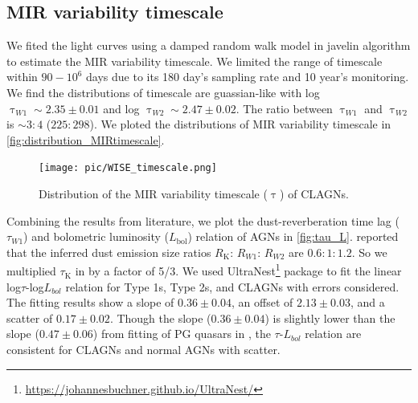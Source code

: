 \subsection{MIR variability timescale}
We fited the light curves using a damped random walk model in {\sc javelin} algorithm \citep[][]{2011ApJ...735...80Z,2013ApJ...765..106Z} to estimate the MIR variability timescale. We limited the range of timescale within $90-10^{6}$ days due to its 180 day's sampling rate and 10 year's monitoring. We find the distributions of timescale are guassian-like with log${\uptau _{W1}}\sim 2.35\pm 0.01$ and log ${\uptau_{W2}}\sim 2.47\pm 0.02$. The ratio between ${\uptau _{W1}}$ and ${\uptau _{W2}}$ is $\sim 3:4$ ($225:298$). We ploted the distributions of MIR variability timescale in \autoref{fig:distribution_MIRtimescale}.

\begin{figure}
\centering
	\texttt{[image: pic/WISE\_timescale.png]}
    \caption{Distribution of the MIR variability timescale ($\uptau$) of CLAGNs.}
    \label{fig:distribution_MIRtimescale}
\end{figure}




Combining the results from literature, we plot the dust-reverberation time lag ($\tau_{W1}$) and bolometric luminosity ($L_\mathrm{bol}$) relation of AGNs in \autoref{fig:tau_L}. \citet[][]{2019ApJ...886...33L} reported that the inferred dust emission size ratios $R_\mathrm{K}$: $R_{W1}$: $R_{W2}$ are $0.6: 1: 1.2$. So we multiplied $\tau_\mathrm{K}$ in \citet[][]{2014ApJ...788..159K,2019ApJ...886...33L} by a factor of 5/3. We used UltraNest\footnote{\url{https://johannesbuchner.github.io/UltraNest/}} package \citep{2021JOSS....6.3001B} to fit the linear log$\tau$-log$L_{bol}$ relation for Type 1s, Type 2s, and CLAGNs with errors considered. The fitting results show a slope of $0.36 \pm 0.04$, an offset of $2.13 \pm 0.03$, and a scatter of $0.17 \pm 0.02$. Though the slope ($0.36 \pm 0.04$) is slightly lower than the slope ($0.47 \pm 0.06$) from fitting of PG quasars in \citet[][]{2019ApJ...886...33L}, the $\tau$-$L_{bol}$ relation are consistent for CLAGNs and normal AGNs with scatter.


